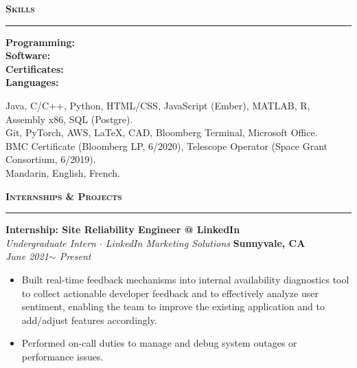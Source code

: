 \documentclass[10pt, letterpaper]{article}
\begin{document}
{\large \textbf{\textsc{Skills}}}
\vspace{5pt}
\hrule
{}
\begin{paracol}{2}
\raggedleft
\textbf{Programming:}\\
\textbf{Software:}\\
\textbf{Certificates:}\\
\textbf{Languages:}\\

\switchcolumn
\raggedright
Java, C/C++, Python, HTML/CSS, JavaScript (Ember), MATLAB, R, Assembly x86, SQL (Postgre).\\
Git, PyTorch, AWS, \LaTeX, CAD, Bloomberg Terminal, Microsoft Office. \\


BMC Certificate (Bloomberg LP, 6/2020), Telescope Operator (Space Grant Consortium, 6/2019).\\
Mandarin, English, French.\\
\end{paracol}
\vspace{2mm}

{\large \textbf{\textsc{Internships \& Projects}}}
\vspace{5pt}
\hrule
{}
\begin{paracol}{2}
	\textbf{Internship: Site Reliability Engineer @ LinkedIn}\\
	\textit{Undergraduate Intern $\cdot$ LinkedIn Marketing Solutions}
	\switchcolumn
	\raggedleft\textbf{Sunnyvale, CA}\\
	\raggedleft\textit{June 2021$\sim$ Present}
\end{paracol}\vspace{-5mm}
\begin{itemize}
	\item Built real-time feedback mechanisms into internal availability diagnostics tool to collect actionable developer feedback and to effectively analyze user sentiment, enabling the team to improve the existing application and to add/adjust features accordingly. \vspace{-3mm}
	\item Performed on-call duties to manage and debug system outages or performance issues.
\end{itemize}
\vspace{-3mm} 
\end{document}
